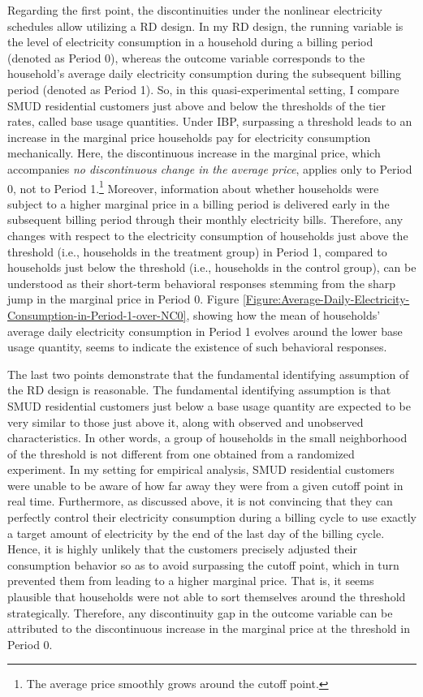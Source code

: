 Regarding the first point, the discontinuities under the nonlinear electricity schedules allow utilizing a RD design. In my RD design, the running variable is the level of electricity consumption in a household during a billing period (denoted as Period 0), whereas the outcome variable corresponds to the household's average daily electricity consumption during the subsequent billing period (denoted as Period 1). So, in this quasi-experimental setting, I compare SMUD residential customers just above and below the thresholds of the tier rates, called base usage quantities. Under IBP, surpassing a threshold leads to an increase in the marginal price households pay for electricity consumption mechanically. Here, the discontinuous increase in the marginal price, which accompanies \textit{no discontinuous change in the average price}, applies only to Period 0, not to Period 1.\footnote{The average price smoothly grows around the cutoff point.} Moreover, information about whether households were subject to a higher marginal price in a billing period is delivered early in the subsequent billing period through their monthly electricity bills. Therefore, any changes with respect to the electricity consumption of households just above the threshold (i.e., households in the treatment group) in Period 1, compared to households just below the threshold (i.e., households in the control group), can be understood as their short-term behavioral responses stemming from the sharp jump in the marginal price in Period 0. Figure \ref{Figure:Average-Daily-Electricity-Consumption-in-Period-1-over-NC0}, showing how the mean of households' average daily electricity consumption in Period 1 evolves around the lower base usage quantity, seems to indicate the existence of such behavioral responses. 

The last two points demonstrate that the fundamental identifying assumption of the RD design is reasonable. The fundamental identifying assumption is that SMUD residential customers just below a base usage quantity are expected to be very similar to those just above it, along with observed and unobserved characteristics. In other words, a group of households in the small neighborhood of the threshold is not different from one obtained from a randomized experiment. In my setting for empirical analysis, SMUD residential customers were unable to be aware of how far away they were from a given cutoff point in real time. Furthermore, as discussed above, it is not convincing that they can perfectly control their electricity consumption during a billing cycle to use exactly a target amount of electricity by the end of the last day of the billing cycle. Hence, it is highly unlikely that the customers precisely adjusted their consumption behavior so as to avoid surpassing the cutoff point, which in turn prevented them from leading to a higher marginal price. That is, it seems plausible that households were not able to sort themselves around the threshold strategically. Therefore, any discontinuity gap in the outcome variable can be attributed to the discontinuous increase in the marginal price at the threshold in Period 0. 
